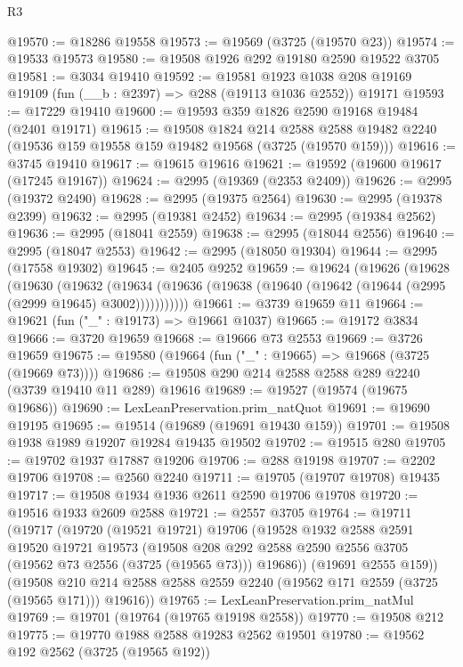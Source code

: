 \begin{lexlean}{R3}
\begin{coremodule}
@19570 := @18286 @19558
@19573 := @19569 (@3725 (@19570 @23))
@19574 := @19533 @19573
@19580 := @19508 @1926 @292 @19180 @2590 @19522 @3705
@19581 := @3034 @19410
@19592 := @19581
    @1923
    @1038
    @208
    @19169
    @19109
    (fun (__b : @2397) => @288 (@19113 @1036 @2552))
    @19171
@19593 := @17229 @19410
@19600 := @19593 @359 @1826 @2590 @19168 @19484 (@2401 @19171)
@19615 := @19508
    @1824
    @214
    @2588
    @2588
    @19482
    @2240
    (@19536 @159 @19558 @159 @19482 @19568 (@3725 (@19570 @159)))
@19616 := @3745 @19410
@19617 := @19615 @19616
@19621 := @19592 (@19600 @19617 (@17245 @19167))
@19624 := @2995 (@19369 (@2353 @2409))
@19626 := @2995 (@19372 @2490)
@19628 := @2995 (@19375 @2564)
@19630 := @2995 (@19378 @2399)
@19632 := @2995 (@19381 @2452)
@19634 := @2995 (@19384 @2562)
@19636 := @2995 (@18041 @2559)
@19638 := @2995 (@18044 @2556)
@19640 := @2995 (@18047 @2553)
@19642 := @2995 (@18050 @19304)
@19644 := @2995 (@17558 @19302)
@19645 := @2405 @9252
@19659 := @19624
    (@19626
      (@19628
        (@19630
          (@19632
            (@19634 (@19636 (@19638 (@19640 (@19642 (@19644 (@2995 (@2999 @19645) @3002)))))))))))
@19661 := @3739 @19659 @11
@19664 := @19621 (fun ("_" : @19173) => @19661 @1037)
@19665 := @19172 @3834
@19666 := @3720 @19659
@19668 := @19666 @73 @2553
@19669 := @3726 @19659
@19675 := @19580 (@19664 (fun ("_" : @19665) => @19668 (@3725 (@19669 @73))))
@19686 := @19508 @290 @214 @2588 @2588 @289 @2240 (@3739 @19410 @11 @289) @19616
@19689 := @19527 (@19574 (@19675 @19686))
@19690 := LexLeanPreservation.prim_natQuot
@19691 := @19690 @19195
@19695 := @19514 (@19689 (@19691 @19430 @159))
@19701 := @19508 @1938 @1989 @19207 @19284 @19435 @19502
@19702 := @19515 @280
@19705 := @19702 @1937 @17887 @19206
@19706 := @288 @19198
@19707 := @2202 @19706
@19708 := @2560 @2240
@19711 := @19705 (@19707 @19708) @19435
@19717 := @19508 @1934 @1936 @2611 @2590 @19706 @19708
@19720 := @19516 @1933 @2609 @2588
@19721 := @2557 @3705
@19764 := @19711
    (@19717
      (@19720
        (@19521 @19721)
        @19706
        (@19528
          @1932
          @2588
          @2591
          @19520
          @19721
          @19573
          (@19508 @208 @292 @2588 @2590 @2556 @3705 (@19562 @73 @2556 (@3725 (@19565 @73))) @19686))
        (@19691 @2555 @159))
      (@19508 @210 @214 @2588 @2588 @2559 @2240 (@19562 @171 @2559 (@3725 (@19565 @171))) @19616))
@19765 := LexLeanPreservation.prim_natMul
@19769 := @19701 (@19764 (@19765 @19198 @2558))
@19770 := @19508 @212
@19775 := @19770 @1988 @2588 @19283 @2562 @19501
@19780 := @19562 @192 @2562 (@3725 (@19565 @192))

\end{coremodule}
\end{lexlean}
